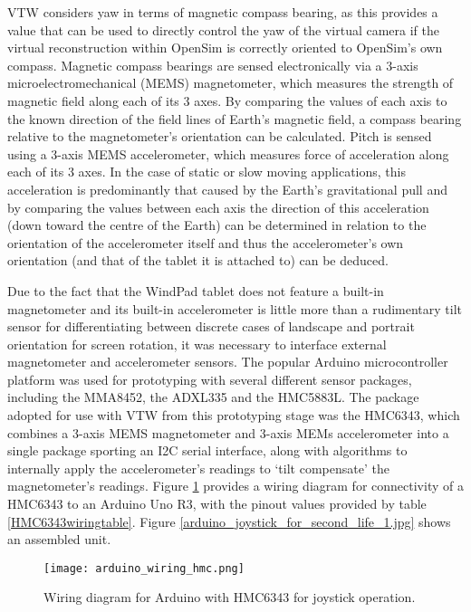VTW considers yaw in terms of magnetic compass bearing, as this provides a value that can be used to directly control the yaw of the virtual camera if the virtual reconstruction within OpenSim is correctly oriented to OpenSim's own compass. Magnetic compass bearings are sensed electronically via a 3-axis microelectromechanical (MEMS) magnetometer, which measures the strength of magnetic field along each of its 3 axes. By comparing the values of each axis to the known direction of the field lines of Earth's magnetic field, a compass bearing relative to the magnetometer's orientation can be calculated. Pitch is sensed using a 3-axis MEMS accelerometer, which measures force of acceleration along each of its 3 axes. In the case of static or slow moving applications, this acceleration is predominantly that caused by the Earth's gravitational pull and by comparing the values between each axis the direction of this acceleration (down toward the centre of the Earth) can be determined in relation to the orientation of the accelerometer itself and thus the accelerometer's own orientation (and that of the tablet it is attached to) can be deduced.

Due to the fact that the WindPad tablet does not feature a built-in magnetometer and its built-in accelerometer is little more than a rudimentary tilt sensor for differentiating between discrete cases of landscape and portrait orientation for screen rotation, it was necessary to interface external magnetometer and accelerometer sensors. The popular Arduino\ArduinoFootnote{} microcontroller platform was used for prototyping with several different sensor packages, including the MMA8452\MMAfootnote{}, the ADXL335\ADXLfootnote{} and the HMC5883L\HMCfootnote{}. The package adopted for use with VTW from this prototyping stage was the HMC6343\HMCtwoFootnote{}, which combines a 3-axis MEMS magnetometer and 3-axis MEMs accelerometer into a single package sporting an I2C serial interface, along with algorithms to internally apply the accelerometer's readings to `tilt compensate' the magnetometer's readings. Figure \ref{arduino_wiring_hmc.png} provides a wiring diagram for connectivity of a HMC6343 to an Arduino Uno R3, with the pinout values provided by table \ref{HMC6343wiringtable}. Figure \ref{arduino_joystick_for_second_life_1.jpg} shows an assembled unit.

\begin{figure}[h]
\centering
  \texttt{[image: arduino\_wiring\_hmc.png]}
  \caption{Wiring diagram for Arduino with HMC6343 for joystick operation.}
  \label{arduino_wiring_hmc.png}
\end{figure}

